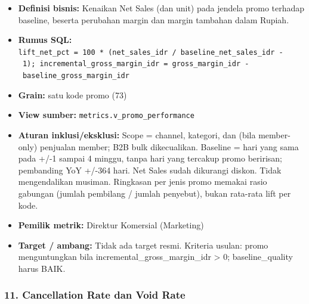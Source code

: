 \documentclass[10pt,a4paper]{article}
\providecommand{\tightlist}{\setlength{\itemsep}{1pt}\setlength{\parskip}{0pt}}
\begin{document}
\begin{itemize}
\tightlist
\item
  \textbf{Definisi bisnis:} Kenaikan Net Sales (dan unit) pada jendela promo terhadap baseline, beserta perubahan margin dan margin tambahan dalam Rupiah.
\item
  \textbf{Rumus SQL:} \texttt{lift\_\allowbreak{}net\_\allowbreak{}pct\ =\ 100\ *\ (net\_\allowbreak{}sales\_\allowbreak{}idr\ /\ baseline\_\allowbreak{}net\_\allowbreak{}sales\_\allowbreak{}idr\ -\ 1);\ incremental\_\allowbreak{}gross\_\allowbreak{}margin\_\allowbreak{}idr\ =\ gross\_\allowbreak{}margin\_\allowbreak{}idr\ -\ baseline\_\allowbreak{}gross\_\allowbreak{}margin\_\allowbreak{}idr}
\item
  \textbf{Grain:} satu kode promo (73)
\item
  \textbf{View sumber:} \texttt{metrics.v\_\allowbreak{}promo\_\allowbreak{}performance}
\item
  \textbf{Aturan inklusi/eksklusi:} Scope = channel, kategori, dan (bila member-only) penjualan member; B2B bulk dikecualikan. Baseline = hari yang sama pada +/-1 sampai 4 minggu, tanpa hari yang tercakup promo beririsan; pembanding YoY +/-364 hari. Net Sales sudah dikurangi diskon. Tidak mengendalikan musiman. Ringkasan per jenis promo memakai rasio gabungan (jumlah pembilang / jumlah penyebut), bukan rata-rata lift per kode.
\item
  \textbf{Pemilik metrik:} Direktur Komersial (Marketing)
\item
  \textbf{Target / ambang:} Tidak ada target resmi. Kriteria usulan: promo menguntungkan bila incremental\_\allowbreak{}gross\_\allowbreak{}margin\_\allowbreak{}idr \textgreater{} 0; baseline\_\allowbreak{}quality harus BAIK.
\end{itemize}

\subsubsection{11. Cancellation Rate dan Void Rate}\label{cancellation-rate-dan-void-rate}
\end{document}
